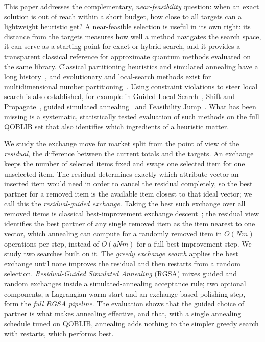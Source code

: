 \documentclass[pdflatex,sn-mathphys-num]{sn-jnl}
\theoremstyle{thmstyleone}
\theoremstyle{thmstylethree}
\begin{document}
This paper addresses the complementary, \emph{near-feasibility} question: when an exact solution is out of reach within a short budget, how close to all targets can a lightweight heuristic get? A near-feasible selection is useful in its own right: its distance from the targets measures how well a method navigates the search space, it can serve as a starting point for exact or hybrid search, and it provides a transparent classical reference for approximate quantum methods evaluated on the same library. Classical partitioning heuristics and simulated annealing have a long history~\cite{kirkpatrick1983,johnson1991,mertens1999}, and evolutionary and local-search methods exist for multidimensional number partitioning~\cite{kratica2014,santucci2021}. Using constraint violations to steer local search is also established, for example in Guided Local Search~\cite{gls1999}, Shift-and-Propagate~\cite{berthold2015}, guided simulated annealing~\cite{chou2003} and Feasibility Jump~\cite{fj2023}. What has been missing is a systematic, statistically tested evaluation of such methods on the full QOBLIB set that also identifies which ingredients of a heuristic matter.

We study the exchange move for market split from the point of view of the \emph{residual}, the difference between the current totals and the targets. An exchange keeps the number of selected items fixed and swaps one selected item for one unselected item. The residual determines exactly which attribute vector an inserted item would need in order to cancel the residual completely, so the best partner for a removed item is the available item closest to that ideal vector; we call this the \emph{residual-guided exchange}. Taking the best such exchange over all removed items is classical best-improvement exchange descent~\cite{johnson1991}; the residual view identifies the best partner of any single removed item as the item nearest to one vector, which annealing can compute for a randomly removed item in $O(Nm)$ operations per step, instead of $O(qNm)$ for a full best-improvement step. We study two searches built on it. The \emph{greedy exchange search} applies the best exchange until none improves the residual and then restarts from a random selection. \emph{Residual-Guided Simulated Annealing} (RGSA) mixes guided and random exchanges inside a simulated-annealing acceptance rule; two optional components, a Lagrangian warm start and an exchange-based polishing step, form the \emph{full RGSA pipeline}. The evaluation shows that the guided choice of partner is what makes annealing effective, and that, with a single annealing schedule tuned on QOBLIB, annealing adds nothing to the simpler greedy search with restarts, which performs best.
\end{document}

